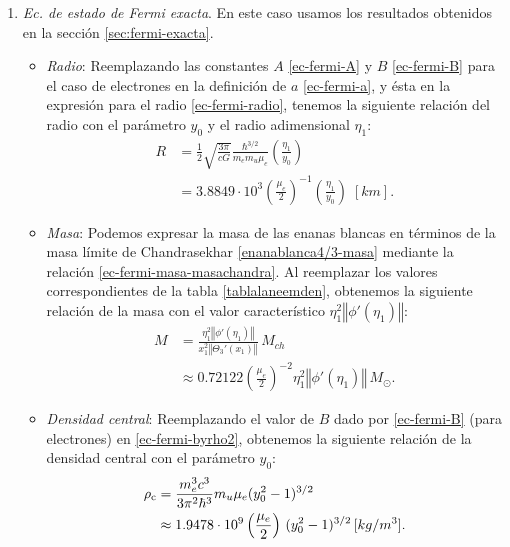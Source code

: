 \begin{enumerate}
\item \emph{Ec. de estado de Fermi exacta}. En este caso usamos los resultados obtenidos en la sección \eqref{sec:fermi-exacta}.
\begin{itemize}
\item \emph{Radio}: Reemplazando las constantes $A$ \eqref{ec-fermi-A} y $B$ \eqref{ec-fermi-B} para el caso de electrones en la definición de $a$ \eqref{ec-fermi-a}, y ésta en la expresión para el radio \eqref{ec-fermi-radio}, tenemos la siguiente relación del radio con el parámetro $y_0$ y el radio adimensional $\eta_1$:
\begin{align}
R&=\frac{1}{2}\sqrt{\frac{3\pi}{cG}}\frac{\hbar^{3/2}}{ m_e m_u \mu_e}\left(\frac{\eta_1}{y_0}\right)\\
&=3.8849\cdot10^3\left(\frac{\mu_e}{2}\right)^{-1}\left(\frac{\eta_1}{y_0}\right)\;[km].\label{enanablanca-exacta-radio}
\end{align}
\item \emph{Masa}: Podemos expresar la masa de las enanas blancas en términos de la masa límite de Chandrasekhar \eqref{enanablanca4/3-masa} mediante la relación \eqref{ec-fermi-masa-masachandra}. Al reemplazar los valores correspondientes de la tabla \ref{tablalaneemden}, obtenemos la siguiente relación de la masa con el valor característico $\eta_1^2\left\Vert\phi'(\eta_1)\right\Vert$:
\begin{align}
M&=\frac{\eta_1^2\left\Vert\phi'(\eta_1)\right\Vert}{x_1^2\left\Vert\Theta_3'(x_1)\right\Vert}\,M_{ch}\\
&\approx0.72122\left(\frac{\mu_e}{2}\right)^{-2}\eta_1^2\left\Vert\phi'(\eta_1)\right\Vert\, M_{\odot}.\label{enanablanca-exacta-masa}
\end{align}
\item \emph{Densidad central}: Reemplazando el valor de $B$ dado por \eqref{ec-fermi-B} (para electrones) en \eqref{ec-fermi-byrho2}, obtenemos la siguiente relación de la densidad central con el parámetro $y_0$:
\begin{align}
\rho_{\rm c}&=\frac{m_e^3 c^3}{3\pi^2\hbar^3}m_u\mu_e(y_0^2-1)^{3/2}\\
&\approx1.9478\cdot10^{9}\left(\frac{\mu_e}{2}\right)\,(y_0^2-1)^{3/2}\,[kg/m^3].\label{enanablanca-exacta-densidad}
\end{align}
\end{itemize}


\end{enumerate}

